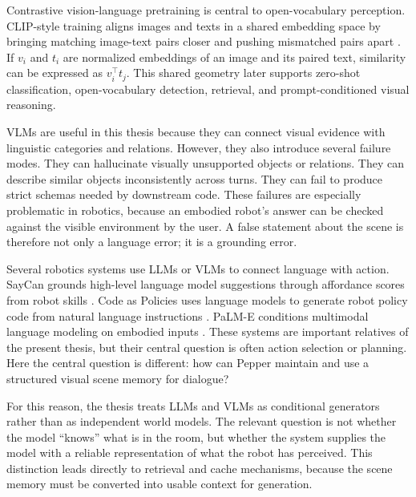 Contrastive vision-language pretraining is central to open-vocabulary perception. CLIP-style training aligns images and texts in a shared embedding space by bringing matching image-text pairs closer and pushing mismatched pairs apart \cite{pmlr-v139-radford21a}. If \(v_i\) and \(t_i\) are normalized embeddings of an image and its paired text, similarity can be expressed as \(v_i^\top t_j\). This shared geometry later supports zero-shot classification, open-vocabulary detection, retrieval, and prompt-conditioned visual reasoning.

VLMs are useful in this thesis because they can connect visual evidence with linguistic categories and relations. However, they also introduce several failure modes. They can hallucinate visually unsupported objects or relations. They can describe similar objects inconsistently across turns. They can fail to produce strict schemas needed by downstream code. These failures are especially problematic in robotics, because an embodied robot's answer can be checked against the visible environment by the user. A false statement about the scene is therefore not only a language error; it is a grounding error.

Several robotics systems use LLMs or VLMs to connect language with action. SayCan grounds high-level language model suggestions through affordance scores from robot skills \cite{ahn_as_2022}. Code as Policies uses language models to generate robot policy code from natural language instructions \cite{liang_code_2023}. PaLM-E conditions multimodal language modeling on embodied inputs \cite{driess_palm-e_2023}. These systems are important relatives of the present thesis, but their central question is often action selection or planning. Here the central question is different: how can Pepper maintain and use a structured visual scene memory for dialogue?

For this reason, the thesis treats LLMs and VLMs as conditional generators rather than as independent world models. The relevant question is not whether the model \enquote{knows} what is in the room, but whether the system supplies the model with a reliable representation of what the robot has perceived. This distinction leads directly to retrieval and cache mechanisms, because the scene memory must be converted into usable context for generation.

